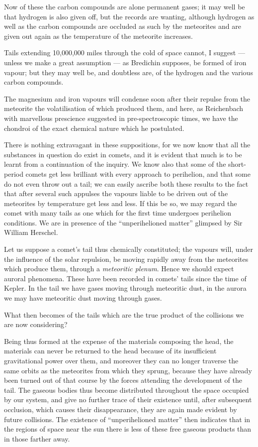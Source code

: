 \documentclass[a4paper, 12pt, oneside, polutonikogreek, english]{article}
\begin{document}
Now of these the carbon compounds are alone permanent gases; it may well be that hydrogen is also given off, but the records are wanting, although hydrogen as well as the carbon compounds are occluded as such by the meteorites and are given out again as the temperature of the meteorite increases.

Tails extending 10,000,000 miles through the cold of space cannot, I suggest --- unless we make a great assumption --- as Bredichin supposes, be formed of iron vapour; but they may well be, and doubtless are, of the hydrogen and the various carbon compounds.

The magnesium and iron vapours will condense soon after their repulse from the meteorite the volatilisation of which produced them, and here, as Reichenbach with marvellous prescience suggested in pre-spectroscopic times, we have the chondroi of the exact chemical nature which he postulated.

There is nothing extravagant in these suppositions, for we now know that all the substances in question do exist in comets, and it is evident that much is to be learnt from a continuation of the inquiry. We know also that some of the short-period comets get less brilliant with every approach to perihelion, and that some do not even throw out a tail; we can easily ascribe both these results to the fact that after several such appulses the vapours liable to be driven out of the meteorites by temperature get less and less. If this be so, we may regard the comet with many tails as one which for the first time undergoes perihelion conditions. We are in presence of the ``unperihelioned matter'' glimpsed by Sir William Herschel.

Let us suppose a comet's tail thus chemically constituted; the vapours will, under the influence of the solar repulsion, be moving rapidly away from the meteorites which produce them, through a \emph{meteoritic plenum}. Hence we should expect auroral phenomena. These have been recorded in comets' tails since the time of Kepler. In the tail we have gases moving through meteoritic dust, in the aurora we may have meteoritic dust moving through gases.

What then becomes of the tails which are the true product of the collisions we are now considering?

Being thus formed at the expense of the materials composing the head, the materials can never be returned to the head because of its insufficient gravitational power over them, and moreover they can no longer traverse the same orbits as the meteorites from which they sprung, because they have already been turned out of that course by the forces attending the development of the tail. The gaseous bodies thus become distributed throughout the space occupied by our system, and give no further trace of their existence until, after subsequent occlusion, which causes their disappearance, they are again made evident by future collisions. The existence of ``unperihelioned matter'' then indicates that in the regions of space near the sun there is less of these free gaseous products than in those farther away.
\end{document}
